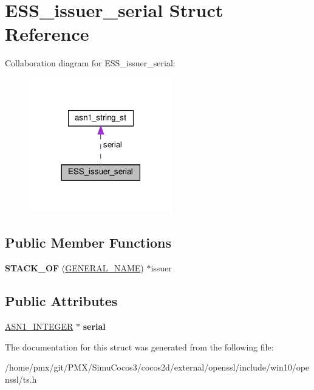 \hypertarget{structESS__issuer__serial}{}\section{E\+S\+S\+\_\+issuer\+\_\+serial Struct Reference}
\label{structESS__issuer__serial}


Collaboration diagram for E\+S\+S\+\_\+issuer\+\_\+serial\+:
\nopagebreak
\begin{figure}[H]
\begin{center}
\leavevmode
\includegraphics[width=177pt]{structESS__issuer__serial__coll__graph}
\end{center}
\end{figure}
\subsection*{Public Member Functions}
\begin{DoxyCompactItemize}
\item 
\mbox{\label{structESS__issuer__serial_af82fe616c7258f0d04c344f002019613}} 
{\bfseries S\+T\+A\+C\+K\+\_\+\+OF} (\hyperlink{structGENERAL__NAME__st}{G\+E\+N\+E\+R\+A\+L\+\_\+\+N\+A\+ME}) $\ast$issuer
\end{DoxyCompactItemize}
\subsection*{Public Attributes}
\begin{DoxyCompactItemize}
\item 
\mbox{\label{structESS__issuer__serial_a7843f6a7d665ee063b624b3d57d16719}} 
\hyperlink{structasn1__string__st}{A\+S\+N1\+\_\+\+I\+N\+T\+E\+G\+ER} $\ast$ {\bfseries serial}
\end{DoxyCompactItemize}


The documentation for this struct was generated from the following file\+:\begin{DoxyCompactItemize}
\item 
/home/pmx/git/\+P\+M\+X/\+Simu\+Cocos3/cocos2d/external/openssl/include/win10/openssl/ts.\+h\end{DoxyCompactItemize}
